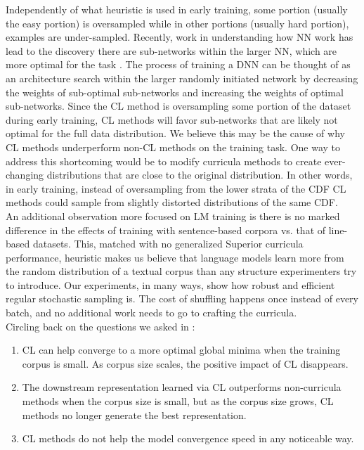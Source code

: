 Independently of what heuristic is used in early training, some portion (usually the easy portion) is oversampled while in other portions (usually hard portion), examples are under-sampled. Recently, work in understanding how NN work has lead to the discovery there are sub-networks within the larger NN, which are more optimal for the task \cite{Frankle2019TheLT}. The process of training a DNN can be thought of as an architecture search within the larger randomly initiated network by decreasing the weights of sub-optimal sub-networks and increasing the weights of optimal sub-networks. Since the CL method is oversampling some portion of the dataset during early training, CL methods will favor sub-networks that are likely not optimal for the full data distribution. We believe this may be the cause of why CL methods underperform non-CL methods on the training task. One way to address this shortcoming would be to modify curricula methods to create ever-changing distributions that are close to the original distribution. In other words, in early training, instead of oversampling from the lower strata of the CDF CL methods could sample from slightly distorted distributions of the same CDF.\\
An additional observation more focused on LM training is there is no marked difference in the effects of training with sentence-based corpora vs. that of line-based datasets. This, matched with no generalized Superior curricula performance, heuristic makes us believe that language models learn more from the random distribution of a textual corpus than any structure experimenters try to introduce. Our experiments, in many ways, show how robust and efficient regular stochastic sampling is. The cost of shuffling happens once instead of every batch, and no additional work needs to go to crafting the curricula.\\
Circling back on the questions we asked in :
\begin{enumerate}
\item CL can help converge to a more optimal global minima when the training corpus is small. As corpus size scales, the positive impact of CL disappears.
\item The downstream representation learned via CL outperforms non-curricula methods when the corpus size is small, but as the corpus size grows, CL methods no longer generate the best representation.
\item CL methods do not help the model convergence speed in any noticeable way.
\end{enumerate}
